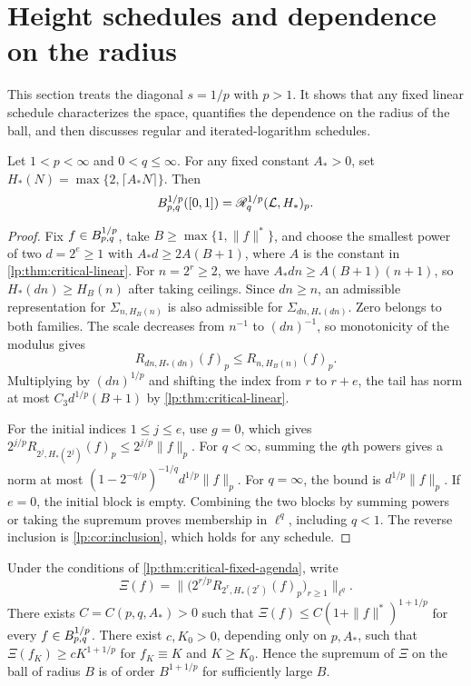 \documentclass[11pt,a4paper]{article}
\begin{document}
\section{Height schedules and dependence on the radius}

This section treats the diagonal $s=1/p$ with $p>1$. It shows that any fixed linear schedule characterizes the space, quantifies the dependence on the radius of the ball, and then discusses regular and iterated-logarithm schedules.

\begin{teorema}
\label{lp:thm:critical-fixed-agenda}
Let $1<p<\infty$ and $0<q\le\infty$. For any fixed constant $A_*>0$, set $H_*(N)=\max\{2,\lceil A_*N\rceil\}$. Then
\[
 B^{1/p}_{p,q}([0,1])=\mathscr R^{1/p}_{q}(\mathcal L,H_*)_p.
\]
\end{teorema}

\begin{proof}
Fix $f\in B^{1/p}_{p,q}$, take $B\ge\max\{1,\|f\|^*\}$, and choose the smallest power of two $d=2^e\ge1$ with $A_*d\ge2A(B+1)$, where $A$ is the constant in \cref{lp:thm:critical-linear}. For $n=2^r\ge2$, we have $A_*dn\ge A(B+1)(n+1)$, so $H_*(dn)\ge H_B(n)$ after taking ceilings. Since $dn\ge n$, an admissible representation for $\Sigma_{n,H_B(n)}$ is also admissible for $\Sigma_{dn,H_*(dn)}$. Zero belongs to both families. The scale decreases from $n^{-1}$ to $(dn)^{-1}$, so monotonicity of the modulus gives
\[
 R_{dn,H_*(dn)}(f)_p\le R_{n,H_B(n)}(f)_p.
\]
Multiplying by $(dn)^{1/p}$ and shifting the index from $r$ to $r+e$, the tail has norm at most $C_3d^{1/p}(B+1)$ by \cref{lp:thm:critical-linear}.

For the initial indices $1\le j\le e$, use $g=0$, which gives $2^{j/p}R_{2^j,H_*(2^j)}(f)_p\le2^{j/p}\|f\|_p$. For $q<\infty$, summing the $q$th powers gives a norm at most $(1-2^{-q/p})^{-1/q}d^{1/p}\|f\|_p$. For $q=\infty$, the bound is $d^{1/p}\|f\|_p$. If $e=0$, the initial block is empty. Combining the two blocks by summing powers or taking the supremum proves membership in $\ell^q$, including $q<1$. The reverse inclusion is \cref{lp:cor:inclusion}, which holds for any schedule.
\end{proof}

\begin{proposicao}
\label{lp:prop:critical-radius-growth}
Under the conditions of \cref{lp:thm:critical-fixed-agenda}, write
\[
 \Xi(f)=\big\|\big(2^{r/p}R_{2^r,H_*(2^r)}(f)_p\big)_{r\ge1}\big\|_{\ell^q}.
\]
There exists $C=C(p,q,A_*)>0$ such that $\Xi(f)\le C(1+\|f\|^*)^{1+1/p}$ for every $f\in B^{1/p}_{p,q}$. There exist $c,K_0>0$, depending only on $p,A_*$, such that $\Xi(f_K)\ge cK^{1+1/p}$ for $f_K\equiv K$ and $K\ge K_0$. Hence the supremum of $\Xi$ on the ball of radius $B$ is of order $B^{1+1/p}$ for sufficiently large $B$.
\end{proposicao}
\end{document}
